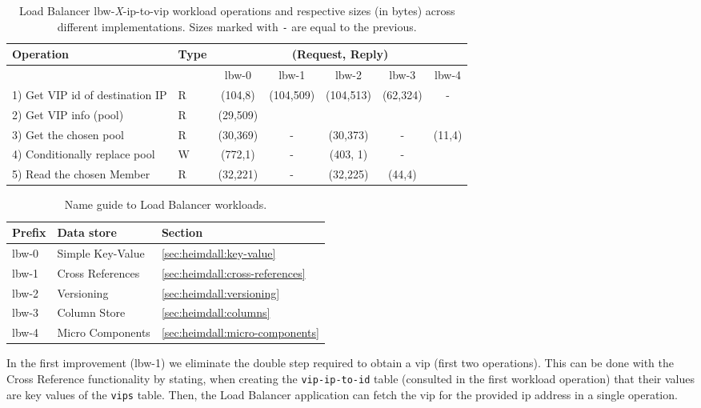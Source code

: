 \begin{table}[ht]
\small
\begin{tabular}{llccccc}
 Operation & Type &  \multicolumn{5}{c}{ (Request, Reply) } \\  \midrule
&  & lbw-0 & lbw-1  & lbw-2 & lbw-3 & lbw-4 \\ \toprule 
1) Get VIP id of destination IP  & R & (104,8) &\multirow{2}{*}{(104,509)} &  \multirow{2}{*}{(104,513)} &\multirow{2}{*}{(62,324)} & \multirow{2}{*}{-}    \\\cmidrule{1-2} 
2) Get VIP info (pool)   & R &  (29,509) & & & &   \\ \midrule 
3) Get the chosen pool  & R & (30,369)  &  - & (30,373) & -   & \multirow{3}{*}[-2mm]{(11,4)}  \\  \cmidrule{1-2} 
4) Conditionally replace pool  & W & (772,1) & -
&(403, 1) &  - \\ \cmidrule{1-2}  
5) Read the chosen Member &  R & (32,221) & - & (32,225) & (44,4) & \\\bottomrule  
\end{tabular}\caption[Load Balancer IP to VIP workload optimizations]{Load Balancer  lbw-\textit{X}-ip-to-vip workload
  operations and respective sizes (in bytes) across different
  implementations. Sizes marked with \texttt{-} are equal to
  the previous. }\label{table:lbw:optimizations}
\end{table}
\begin{table}[ht]
\small
\begin{tabular}{lll} 
  Prefix &  Data store & Section\\\toprule
  lbw-0 & Simple Key-Value  &  \ref{sec:heimdall:key-value} \\
  lbw-1 & Cross References  & \ref{sec:heimdall:cross-references} \\
  lbw-2 & Versioning & \ref{sec:heimdall:versioning} \\
  lbw-3 & Column Store & \ref{sec:heimdall:columns}\\
  lbw-4 & Micro Components & \ref{sec:heimdall:micro-components} \\ \bottomrule
  \end{tabular}
  \caption[Name guide to Load Balancer workloads]{Name guide to Load Balancer workloads.}\label{table:lb-versions}
\end{table}


In the first improvement (lbw-1) we eliminate the double step required to obtain a \gls{vip} (first two operations). 
This can be done with the Cross Reference functionality by stating, when creating the \texttt{vip-ip-to-id} table (consulted in the first workload operation)  that their values are key values of the \texttt{vips} table. 
Then, the Load Balancer application can  fetch the \gls{vip} for the provided \gls{ip} address in a single operation. 


